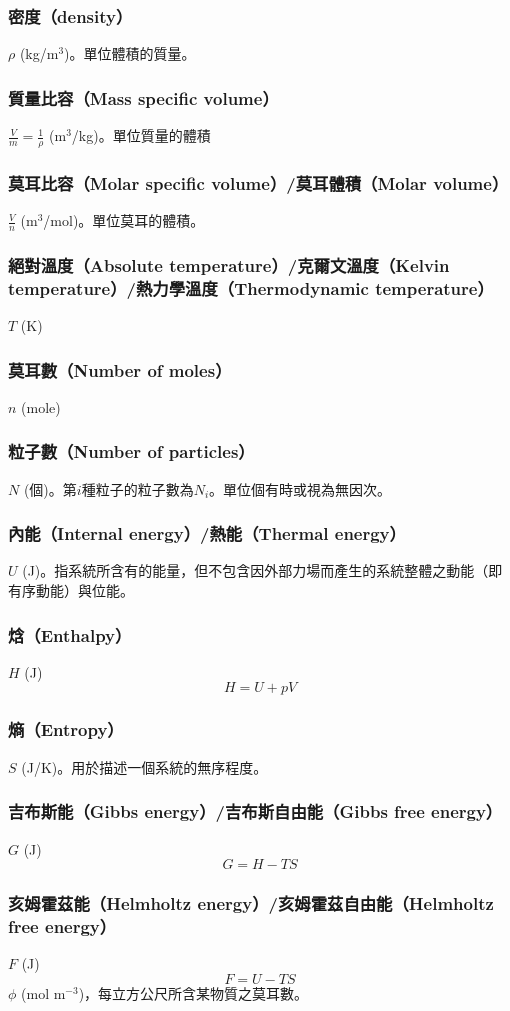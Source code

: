 \documentclass[a4paper,12pt]{report}
\begin{document}
\subsubsection{密度（density）}
\(\rho\) (kg/m\(^3\))。單位體積的質量。
\subsubsection{質量比容（Mass specific volume）}
$\frac{V}{m}=\frac{1}{\rho}$ (m$^3$/kg)。單位質量的體積
\subsubsection{莫耳比容（Molar specific volume）/莫耳體積（Molar volume）}
$\frac{V}{n}$ (m$^3$/mol)。單位莫耳的體積。
\subsubsection{絕對溫度（Absolute temperature）/克爾文溫度（Kelvin temperature）/熱力學溫度（Thermodynamic temperature）}
$T$ (K)
\subsubsection{莫耳數（Number of moles）}
$n$ (mole)
\subsubsection{粒子數（Number of particles）}
$N$ (個)。第$i$種粒子的粒子數為$N_i$。單位個有時或視為無因次。
\subsubsection{內能（Internal energy）/熱能（Thermal energy）}
$U$ (J)。指系統所含有的能量，但不包含因外部力場而產生的系統整體之動能（即有序動能）與位能。
\subsubsection{焓（Enthalpy）}
$H$ (J)
\[H = U + pV\]
\subsubsection{熵（Entropy）}
$S$ (J/K)。用於描述一個系統的無序程度。
\subsubsection{吉布斯能（Gibbs energy）/吉布斯自由能（Gibbs free energy）}
$G$ (J)
\[G = H - TS\]
\subsubsection{亥姆霍茲能（Helmholtz energy）/亥姆霍茲自由能（Helmholtz free energy）}
$F$ (J)
\[F = U - TS\]
$\phi$ (mol m$^{-3}$)，每立方公尺所含某物質之莫耳數。
\end{document}
